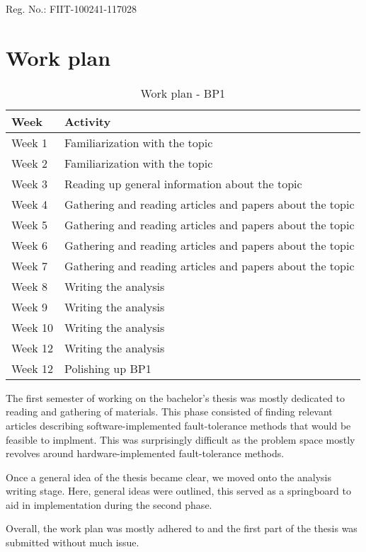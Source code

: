 \documentclass[12pt, letterpaper]{article}
\begin{document}
\begin{appendices}

Reg. No.: FIIT-100241-117028

\section{Work plan}

\begin{table}[!h]
\centering
\begin{tabular}{|l|l|}
\hline
\textbf{Week} & \textbf{Activity} \\
\hline
Week 1 & Familiarization with the topic \\
Week 2 & Familiarization with the topic \\
Week 3 & Reading up general information about the topic \\
Week 4 & Gathering and reading articles and papers about the topic \\
Week 5 & Gathering and reading articles and papers about the topic \\
Week 6 & Gathering and reading articles and papers about the topic \\
Week 7 & Gathering and reading articles and papers about the topic \\
Week 8 & Writing the analysis \\
Week 9 & Writing the analysis \\
Week 10 & Writing the analysis \\
Week 12 & Writing the analysis \\
Week 12 & Polishing up BP1 \\
\hline
\end{tabular}
\caption{Work plan - BP1}
\label{tab:work_plan_bp1}
\end{table}

The first semester of working on the bachelor's thesis was mostly dedicated to reading and gathering of materials. This phase consisted of finding relevant articles describing software-implemented fault-tolerance methods that would be feasible to implment. This was surprisingly difficult as the problem space mostly revolves around hardware-implemented fault-tolerance methods.

Once a general idea of the thesis became clear, we moved onto the analysis writing stage. Here, general ideas were outlined, this served as a springboard to aid in implementation during the second phase.

Overall, the work plan was mostly adhered to and the first part of the thesis was submitted without much issue.


\end{appendices}
\end{document}
